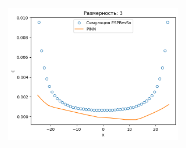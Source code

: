 \documentclass[t]{beamer}
\begin{document}
\begin{frame}
\begin{figure}[h]
\begin{subfigure}{0.35\textwidth}
            \end{subfigure}
        \end{figure}
        \begin{figure}[H]
            \center
            \includegraphics[width=0.4\textwidth]{../plots/ek/3-dim tanh 20x4.png}
        \end{figure}        
    \end{frame}
\end{document}

